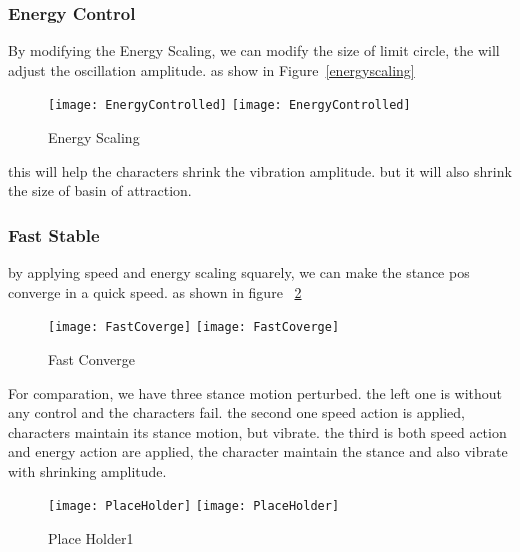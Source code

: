 \subsubsection*{Energy Control}
By modifying the Energy Scaling, we can modify the size of limit circle, the will adjust the oscillation amplitude.
as show in Figure~\ref{energyscaling}
\begin{figure}[!htbp]
  \begin{center}
    \leavevmode
    \ifpdf
      \texttt{[image: EnergyControlled]}
    \else
      \texttt{[image: EnergyControlled]}
    \fi
    \caption{Energy Scaling}
    \label{fig:energyscaling}
\end{center}
\end{figure}

this will help the characters shrink the vibration amplitude.
but it will also shrink the size of basin of attraction.




\subsubsection*{Fast Stable}
by applying speed and energy scaling squarely, we can make the stance pos converge in a quick speed.
as shown in figure ~\ref{fig:fastconverg}
\begin{figure}[!htbp]
  \begin{center}
    \leavevmode
    \ifpdf
      \texttt{[image: FastCoverge]}
    \else
      \texttt{[image: FastCoverge]}
    \fi
    \caption{Fast Converge}
    \label{fig:fastconverg}
\end{center}
\end{figure}


For comparation, we have three stance motion perturbed.
the left one is without any control and the characters fail.
the second one speed action is applied, characters maintain its stance motion, but vibrate.
the third is both speed action and energy action are applied, the character maintain the stance and also vibrate with shrinking amplitude.

\begin{figure}[!htbp]
  \begin{center}
    \leavevmode
    \ifpdf
      \texttt{[image: PlaceHolder]}
    \else
      \texttt{[image: PlaceHolder]}
    \fi
    \caption{Place Holder1}
    \label{fig:stancefall}
\end{center}
\end{figure}

